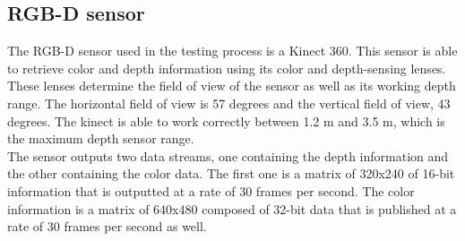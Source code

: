 



\newpage
\subsection{RGB-D sensor}
	The RGB-D sensor used in the testing process is a Kinect 360. 
	This sensor is able to retrieve color and depth information using its color and depth-sensing lenses. 
	These lenses determine the field of view of the sensor as well as its working depth range. 
	The horizontal field of view is 57 degrees and the vertical field of view, 43 degrees. 
	The kinect is able to work correctly between 1.2 m and 3.5 m, which is the maximum depth sensor range. 
	\\

	The sensor outputs two data streams, one containing the depth information and the other containing the color data. 
	The first one is a matrix of 320x240 of 16-bit information that is outputted at a rate of 30 frames per second. 
	The color information is a matrix of 640x480 composed of 32-bit data that is published at a rate of 30 frames per second as well. 

